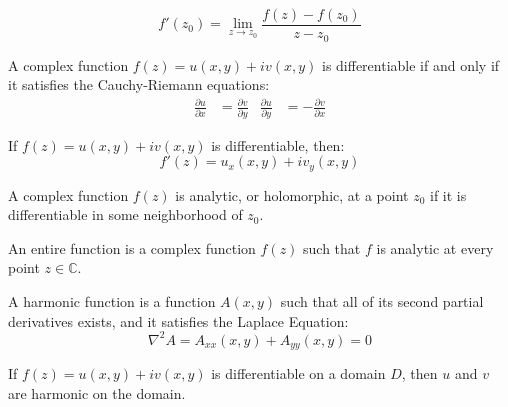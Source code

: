         \begin{equation*}
            f'(z_{0})=\lim_{z\rightarrow{z_{0}}}\frac{f(z)-f(z_{0})}{z-z_{0}}
        \end{equation*}
        \begin{theorem}
            A complex function $f(z)=u(x,y)+iv(x,y)$ is
            differentiable if and only if it satisfies
            the Cauchy-Riemann equations:
            \begin{align*}
                \frac{\partial{u}}{\partial{x}}
                &=\frac{\partial{v}}{\partial{y}}
                &
                \frac{\partial{u}}{\partial{y}}
                &=-\frac{\partial{v}}{\partial{x}}
            \end{align*}
        \end{theorem}
        \begin{theorem}
            If $f(z)=u(x,y)+iv(x,y)$ is differentiable,
            then:
            \begin{equation*}
                f'(z)=u_{x}(x,y)+iv_{y}(x,y)
            \end{equation*}
        \end{theorem}
        \begin{definition}
            A complex function $f(z)$ is analytic,
            or holomorphic, at a point $z_{0}$ if
            it is differentiable in some neighborhood of
            $z_{0}$.
        \end{definition}
        \begin{definition}
            An entire function is a complex function
            $f(z)$ such that $f$ is analytic at every
            point $z\in\mathbb{C}$.
        \end{definition}
        \begin{definition}
            A harmonic function is a function
            $A(x,y)$ such that all of its second
            partial derivatives exists, and it
            satisfies the Laplace Equation:
            \begin{equation*}
                \nabla^{2}A
                =A_{xx}(x,y)+A_{yy}(x,y)
                =0
            \end{equation*}
        \end{definition}
        \begin{theorem}
            If $f(z)=u(x,y)+iv(x,y)$ is differentiable
            on a domain $D$, then $u$ and $v$ are
            harmonic on the domain.
        \end{theorem}
